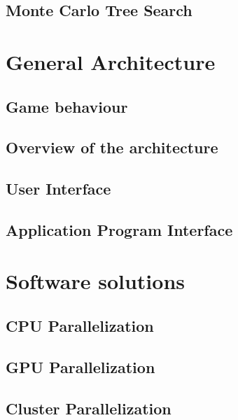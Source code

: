 \documentclass[12pt]{article}
\begin{document}
	\subsection{Monte Carlo Tree Search}			\label{sec:mcts}			
\newpage

\section{General Architecture}					\label{sec:generalArchitecture} 		
	\subsection{Game behaviour}				\label{sec:gameBehavioiur}		
	\subsection{Overview of the architecture}		\label{sec:globalview}			
	\subsection{User Interface}				\label{sec:ui}				
	\subsection{Application Program Interface}		\label{sec:api}				
\newpage

\section{Software solutions}					\label{sec:softwareSolutions}
	\subsection{CPU Parallelization}			\label{sec:openmp}			
	\subsection{GPU Parallelization}			\label{sec:openacc}			
	\subsection{Cluster Parallelization}			\label{sec:mpi}				
\end{document}
